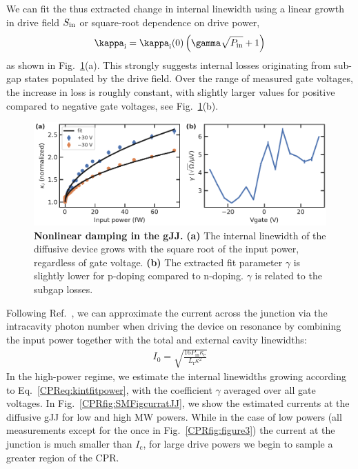 We can fit the thus extracted change in internal linewidth using a linear growth in drive field $S_{\rm in}$ or square-root dependence on drive power,
\begin{align}
\kappa_\text{i}=\kappa_\text{i}(0)\left(\gamma\sqrt{P_{\rm in}}+1\right)
\label{CPReq:kintfitpower}
\end{align}
as shown in Fig.~\ref{CPRfig:SMFig-lossrates-power}(a).
%
This strongly suggests internal losses originating from sub-gap states populated by the drive field.
%
Over the range of measured gate voltages, the increase in loss is roughly constant, with slightly larger values for positive compared to negative gate voltages, see Fig.~\ref{CPRfig:SMFig-lossrates-power}(b).

\begin{figure}
	\centering
	\includegraphics[width=\linewidth]{chapter-gJJ-CPR/figs/SMFigure-lossrates-power}
	\caption{
		\textbf{Nonlinear damping in the gJJ.}
		\textbf{(a)} The internal linewidth of the diffusive device grows with the square root of the input power, regardless of gate voltage.
		\textbf{(b)} The extracted fit parameter $\gamma$ is slightly lower for p-doping compared to n-doping.
		$\gamma$ is related to the subgap losses.
	}
	\label{CPRfig:SMFig-lossrates-power}
\end{figure}

Following Ref.~\cite{schmidtCurrentDetectionUsing2020}, we can approximate the current across the junction via the intracavity photon number when driving the device on resonance by combining the input power together with the total and external cavity linewidths:
%
\begin{align}
I_0 = \sqrt{\frac{16 P_\text{in} \kappa_\text{e}}{L_\text{r} \kappa^2}}
\label{CPReq:curratJJ}
\end{align}
%
In the high-power regime, we estimate the internal linewidths growing according to Eq.~\ref{CPReq:kintfitpower}, with the coefficient $\gamma$ averaged over all gate voltages.
%
In Fig.~\ref{CPRfig:SMFigcurratJJ}, we show the estimated currents at the diffusive gJJ for low and high MW powers.
%
While in the case of low powers (all measurements except for the once in Fig.~\ref{CPRfig:figure3}) the current at the junction is much smaller than $I_\text{c}$, for large drive powers we begin to sample a greater region of the CPR.

